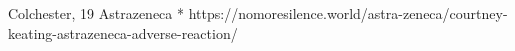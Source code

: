           {Colchester, }
          {19}
          {Astrazeneca}
          {*}
          {
          }
          {https://nomoresilence.world/astra-zeneca/courtney-keating-astrazeneca-adverse-reaction/}
